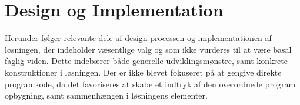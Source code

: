 \chapter{Design og Implementation}

Herunder følger relevante dele af design processen og implementationen af løsningen, der indeholder væsentlige valg og som ikke vurderes til at være basal faglig viden. Dette indebærer både generelle udviklingsmønstre, samt konkrete konstruktioner i løsningen. Der er ikke blevet fokuseret på at gengive direkte programkode, da det favoriseres at skabe et indtryk af den overordnede program opbygning, samt sammenhængen i løsningens elementer.






